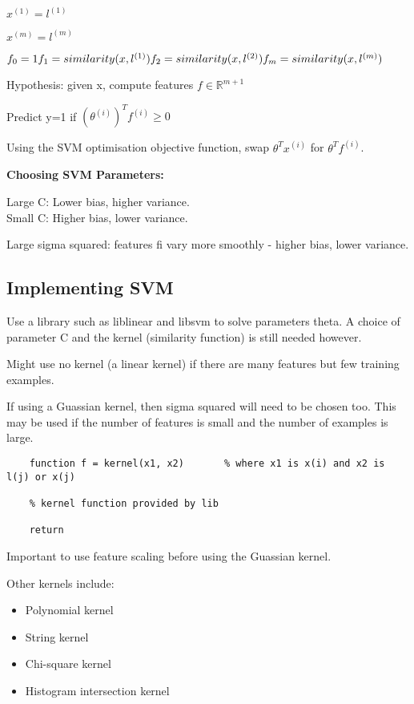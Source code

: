 \documentclass[12pt] {article}
\begin{document}
{    $x^{(1)} = l^{(1)}$ 

    $x^{(m)} = l^{(m)}$

    $f_0 = 1\\
    f_1 = similarity(x, l^{(1)})\\
    f_2 = similarity(x, l^{(2)})\\
    f_m = similarity(x, l^{(m)})$

    Hypothesis: given x, compute features $f\in\mathbb{R}^{m+1}$

    Predict y=1 if $(\theta^{(i)})^T f^{(i)} \geq 0$

    Using the SVM optimisation objective function, swap $\theta^Tx^{(i)}$ for 
    $\theta^Tf^{(i)}$.

    \textbf{Choosing SVM Parameters:}
    
    Large C: Lower bias, higher variance.\\
    Small C: Higher bias, lower variance.

    Large sigma squared: features fi vary more smoothly - higher bias, lower
    variance. 

  \subsection{Implementing SVM}

    Use a library such as liblinear and libsvm to solve parameters theta.
    A choice of parameter C and the kernel (similarity function) is still
    needed however. 

    Might use no kernel (a linear kernel) if there are many features but few
    training examples. 

    If using a Guassian kernel, then sigma squared will need to be chosen too.
    This may be used if the number of features is small and the number of 
    examples is large. 

    \begin{lstlisting}
    function f = kernel(x1, x2)       % where x1 is x(i) and x2 is l(j) or x(j)

    % kernel function provided by lib

    return
    \end{lstlisting}

    Important to use feature scaling before using the Guassian kernel. 

    Other kernels include:
    \vspace{-1em}
    \begin{itemize}
      \item Polynomial kernel
      \item String kernel
      \item Chi-square kernel
      \item Histogram intersection kernel
    \end{itemize}

}
\end{document}
